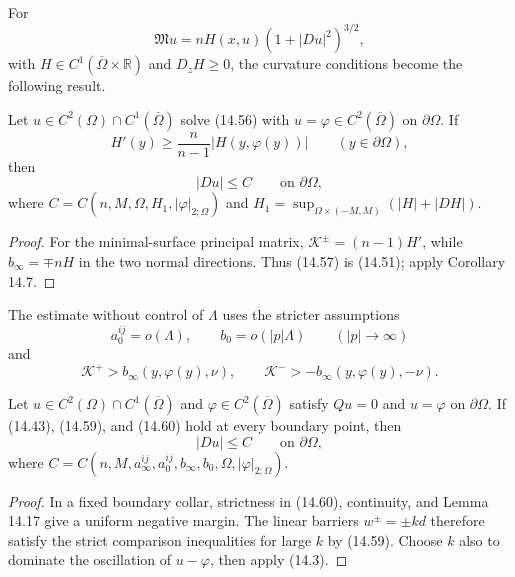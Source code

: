 For
\begin{equation}
\mathfrak Mu=nH(x,u)(1+|Du|^2)^{3/2},
\tag{14.56}
\end{equation}
with $H\in C^1(\overline\Omega\times\mathbb R)$ and $D_zH\geq0$, the curvature
conditions become the following result.

\begin{corollary}
\label{gt14-boundary-gradient-14-8}
Let $u\in C^2(\Omega)\cap C^1(\overline\Omega)$ solve (14.56) with
$u=\varphi\in C^2(\overline\Omega)$ on $\partial\Omega$. If
\begin{equation}
H'(y)\geq\frac n{n-1}|H(y,\varphi(y))|
\qquad(y\in\partial\Omega),
\tag{14.57}
\end{equation}
then
\begin{equation}
|Du|\leq C\qquad\text{on }\partial\Omega,
\tag{14.58}
\end{equation}
where
$C=C(n,M,\Omega,H_1,|\varphi|_{2;\Omega})$ and
$H_1=\sup_{\Omega\times(-M,M)}(|H|+|DH|)$.
\end{corollary}
\begin{proof}
\sketch For the minimal-surface principal matrix,
$\mathcal K^\pm=(n-1)H'$, while
$b_\infty=\mp nH$ in the two normal directions. Thus (14.57) is (14.51);
apply Corollary 14.7.
\end{proof}

The estimate without control of $\Lambda$ uses the stricter assumptions
\begin{equation}
a_0^{ij}=o(\Lambda),\qquad b_0=o(|p|\Lambda)
\qquad(|p|\to\infty)
\tag{14.59}
\end{equation}
and
\begin{equation}
\mathcal K^+>b_\infty(y,\varphi(y),\nu),\qquad
\mathcal K^->-b_\infty(y,\varphi(y),-\nu).
\tag{14.60}
\end{equation}

\begin{theorem}
\label{gt14-boundary-gradient-14-9}
Let $u\in C^2(\Omega)\cap C^1(\overline\Omega)$ and
$\varphi\in C^2(\overline\Omega)$ satisfy $Qu=0$ and
$u=\varphi$ on $\partial\Omega$. If (14.43), (14.59), and (14.60) hold at
every boundary point, then
\begin{equation}
|Du|\leq C\qquad\text{on }\partial\Omega,
\tag{14.61}
\end{equation}
where
$C=C(n,M,a_\infty^{ij},a_0^{ij},b_\infty,b_0,\Omega,
|\varphi|_{2;\Omega})$.
\end{theorem}
\begin{proof}
\sketch In a fixed boundary collar, strictness in (14.60), continuity, and
Lemma 14.17 give a uniform negative margin. The linear barriers $w^\pm=\pm kd$
therefore satisfy the strict comparison inequalities for large $k$ by (14.59).
Choose $k$ also to dominate the oscillation of $u-\varphi$, then apply (14.3).
\end{proof}

